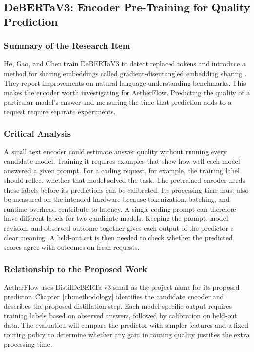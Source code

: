\documentclass{FastFyp}
\begin{document}
\subsection{DeBERTaV3: Encoder Pre-Training for Quality Prediction}
\subsubsection{Summary of the Research Item}
He, Gao, and Chen train DeBERTaV3 to detect replaced tokens and introduce a method for sharing embeddings called gradient-disentangled embedding sharing \cite{ref:DeBERTaV3}. They report improvements on natural language understanding benchmarks. This makes the encoder worth investigating for AetherFlow. Predicting the quality of a particular model's answer and measuring the time that prediction adds to a request require separate experiments.

\subsubsection{Critical Analysis}
A small text encoder could estimate answer quality without running every candidate model. Training it requires examples that show how well each model answered a given prompt. For a coding request, for example, the training label should reflect whether that model solved the task. The pretrained encoder needs these labels before its predictions can be calibrated. Its processing time must also be measured on the intended hardware because tokenization, batching, and runtime overhead contribute to latency. A single coding prompt can therefore have different labels for two candidate models. Keeping the prompt, model revision, and observed outcome together gives each output of the predictor a clear meaning. A held-out set is then needed to check whether the predicted scores agree with outcomes on fresh requests.

\subsubsection{Relationship to the Proposed Work}
AetherFlow uses DistilDeBERTa-v3-small as the project name for its proposed predictor. Chapter~\ref{ch:methodology} identifies the candidate encoder and describes the proposed distillation step. Each model-specific output requires training labels based on observed answers, followed by calibration on held-out data. The evaluation will compare the predictor with simpler features and a fixed routing policy to determine whether any gain in routing quality justifies the extra processing time.
\end{document}
